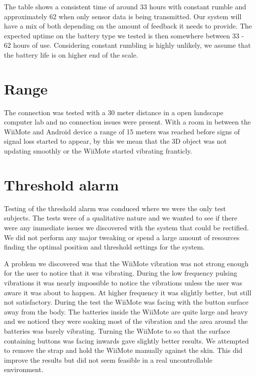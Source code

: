 The table shows a consistent time of around 33 hours with constant rumble and approximately 62 when only sensor data is being transmitted. Our system will have a mix of both depending on the amount of feedback it needs to provide. The expected uptime on the battery type we tested is then somewhere between 33 - 62 hours of use. Considering constant rumbling is highly unlikely, we assume that the battery life is on higher end of the scale.

\section{Range}
The connection was tested with a 30 meter distance in a open landscape computer lab and no connection issues were present. With a room in between the WiiMote and Android device a range of 15 meters was reached before signs of signal loss started to appear, by this we mean that the 3D object was not updating smoothly or the WiiMote started vibrating franticly.

\section{Threshold alarm}
Testing of the threshold alarm was conduced where we were the only test subjects. The tests were of a qualitative nature and we wanted to see if there were any immediate issues we discovered with the system that could be rectified. We did not perform any major tweaking or spend a large amount of resources finding the optimal position and threshold settings for the system. 

A problem we discovered was that the WiiMote vibration was not strong enough for the user to notice that it was vibrating. During the low frequency pulsing vibrations it was nearly impossible to notice the vibrations unless the user was aware it was about to happen. At higher frequency it was slightly better, but still not satisfactory. During the test the WiiMote was facing with the button surface away from the body. The batteries inside the WiiMote are quite large and heavy and we noticed they were soaking most of the vibration and the area around the batteries was barely vibrating. Turning the WiiMote to  so that the surface containing buttons was facing inwards gave slightly better results. We attempted to remove the strap and hold the WiiMote manually against the skin. This did improve the results but did not seem feasible in a real uncontrollable environment.